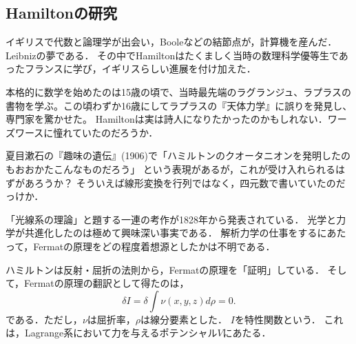 \documentclass[uplatex,dvipdfmx]{jsreport}
\begin{document}
\subsection{Hamiltonの研究}

\begin{tcolorbox}[colframe=ForestGreen, colback=ForestGreen!10!white,breakable,colbacktitle=ForestGreen!40!white,coltitle=black,fonttitle=\bfseries\sffamily,
title=]
    
\end{tcolorbox}

\begin{history}
    イギリスで代数と論理学が出会い，Booleなどの結節点が，計算機を産んだ．Leibnizの夢である．
    その中でHamiltonはたくましく当時の数理科学優等生であったフランスに学び，イギリスらしい進展を付け加えた．

    本格的に数学を始めたのは15歳の頃で、当時最先端のラグランジュ、ラプラスの書物を学ぶ。この頃わずか16歳にしてラプラスの『天体力学』に誤りを発見し、専門家を驚かせた。
    Hamiltonは実は詩人になりたかったのかもしれない．ワーズワースに憧れていたのだろうか．
\end{history}
\begin{remark}
    夏目漱石の『趣味の遺伝』(1906)で「ハミルトンのクオータニオンを発明したのもおおかたこんなものだろう」
という表現があるが，これが受け入れられるはずがあろうか？
そういえば線形変換を行列ではなく，四元数で書いていたのだっけか．
\end{remark}


\begin{history}[Hamiltonの光学研究]
    「光線系の理論」と題する一連の考作が1828年から発表されている．
    光学と力学が共進化したのは極めて興味深い事実である．
    解析力学の仕事をするにあたって，Fermatの原理をどの程度着想源としたかは不明である．

    ハミルトンは反射・屈折の法則から，Fermatの原理を「証明」している．
    そして，Fermatの原理の翻訳として得たのは，
    \[\delta I=\delta\int\nu(x,y,z)d\rho=0.\]
    である．ただし，$\nu$は屈折率，$\rho$は線分要素とした．
    $I$を特性関数という．
    これは，Lagrange系において力を与えるポテンシャル$V$にあたる．
\end{history}
\end{document}
